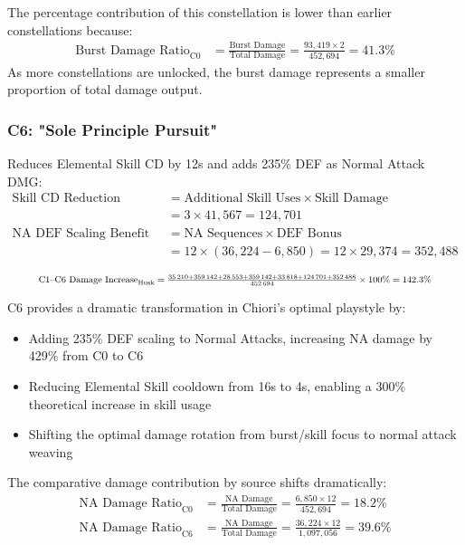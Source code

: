 \documentclass[12pt,a4paper]{article}
\begin{document}
The percentage contribution of this constellation is lower than earlier constellations because:
\begin{align}
\text{Burst Damage Ratio}_{\text{C0}} &= \frac{\text{Burst Damage}}{\text{Total Damage}} = \frac{93,419 \times 2}{452,694} = 41.3\%
\end{align}
As more constellations are unlocked, the burst damage represents a smaller proportion of total damage output.

\subsubsection{C6: "Sole Principle Pursuit"}
Reduces Elemental Skill CD by 12s and adds 235\% DEF as Normal Attack DMG:
\begin{align}
\text{Skill CD Reduction Benefit} &= \text{Additional Skill Uses} \times \text{Skill Damage} \\
&= 3 \times 41,567 = 124,701 \\
\text{NA DEF Scaling Benefit} &= \text{NA Sequences} \times \text{DEF Bonus} \\
&= 12 \times (36,224 - 6,850) = 12 \times 29,374 = 352,488 \\
\end{align}
\[
\resizebox{.9\textwidth}{!}{$
\text{C1--C6 Damage Increase}_{\text{Husk}}
= \frac{35\,210 + 359\,142 + 28\,553 + 359\,142 + 33\,818 + 124\,701 + 352\,488}
       {452\,694}\times 100\%
= 142.3\%
$}
\]


C6 provides a dramatic transformation in Chiori's optimal playstyle by:
\begin{itemize}
    \item Adding 235\% DEF scaling to Normal Attacks, increasing NA damage by 429\% from C0 to C6
    \item Reducing Elemental Skill cooldown from 16s to 4s, enabling a 300\% theoretical increase in skill usage
    \item Shifting the optimal damage rotation from burst/skill focus to normal attack weaving
\end{itemize}

The comparative damage contribution by source shifts dramatically:
\begin{align}
\text{NA Damage Ratio}_{\text{C0}} &= \frac{\text{NA Damage}}{\text{Total Damage}} = \frac{6,850 \times 12}{452,694} = 18.2\% \\
\text{NA Damage Ratio}_{\text{C6}} &= \frac{\text{NA Damage}}{\text{Total Damage}} = \frac{36,224 \times 12}{1,097,056} = 39.6\%
\end{align}
\end{document}
